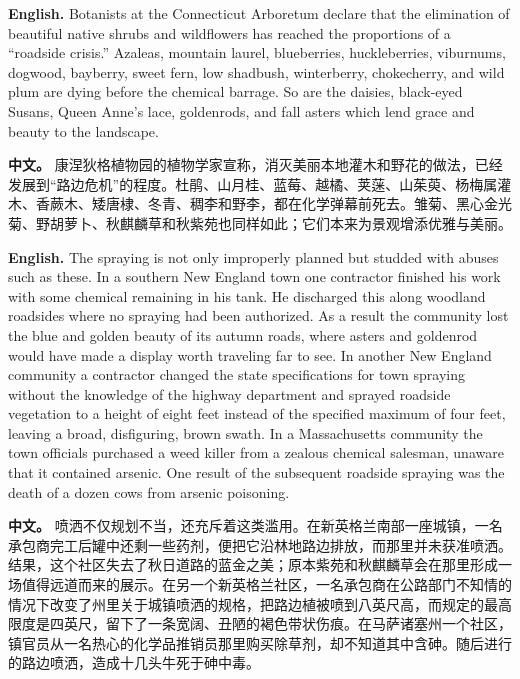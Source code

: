 \noindent\textbf{English.} Botanists at the Connecticut Arboretum declare that the elimination of beautiful native shrubs and wildflowers has reached the proportions of a ``roadside crisis.'' Azaleas, mountain laurel, blueberries, huckleberries, viburnums, dogwood, bayberry, sweet fern, low shadbush, winterberry, chokecherry, and wild plum are dying before the chemical barrage. So are the daisies, black-eyed Susans, Queen Anne's lace, goldenrods, and fall asters which lend grace and beauty to the landscape.
\par
\noindent\textbf{中文。} 康涅狄格植物园的植物学家宣称，消灭美丽本地灌木和野花的做法，已经发展到“路边危机”的程度。杜鹃、山月桂、蓝莓、越橘、荚蒾、山茱萸、杨梅属灌木、香蕨木、矮唐棣、冬青、稠李和野李，都在化学弹幕前死去。雏菊、黑心金光菊、野胡萝卜、秋麒麟草和秋紫苑也同样如此；它们本来为景观增添优雅与美丽。
\par\medskip

\noindent\textbf{English.} The spraying is not only improperly planned but studded with abuses such as these. In a southern New England town one contractor finished his work with some chemical remaining in his tank. He discharged this along woodland roadsides where no spraying had been authorized. As a result the community lost the blue and golden beauty of its autumn roads, where asters and goldenrod would have made a display worth traveling far to see. In another New England community a contractor changed the state specifications for town spraying without the knowledge of the highway department and sprayed roadside vegetation to a height of eight feet instead of the specified maximum of four feet, leaving a broad, disfiguring, brown swath. In a Massachusetts community the town officials purchased a weed killer from a zealous chemical salesman, unaware that it contained arsenic. One result of the subsequent roadside spraying was the death of a dozen cows from arsenic poisoning.
\par
\noindent\textbf{中文。} 喷洒不仅规划不当，还充斥着这类滥用。在新英格兰南部一座城镇，一名承包商完工后罐中还剩一些药剂，便把它沿林地路边排放，而那里并未获准喷洒。结果，这个社区失去了秋日道路的蓝金之美；原本紫苑和秋麒麟草会在那里形成一场值得远道而来的展示。在另一个新英格兰社区，一名承包商在公路部门不知情的情况下改变了州里关于城镇喷洒的规格，把路边植被喷到八英尺高，而规定的最高限度是四英尺，留下了一条宽阔、丑陋的褐色带状伤痕。在马萨诸塞州一个社区，镇官员从一名热心的化学品推销员那里购买除草剂，却不知道其中含砷。随后进行的路边喷洒，造成十几头牛死于砷中毒。
\par\medskip

